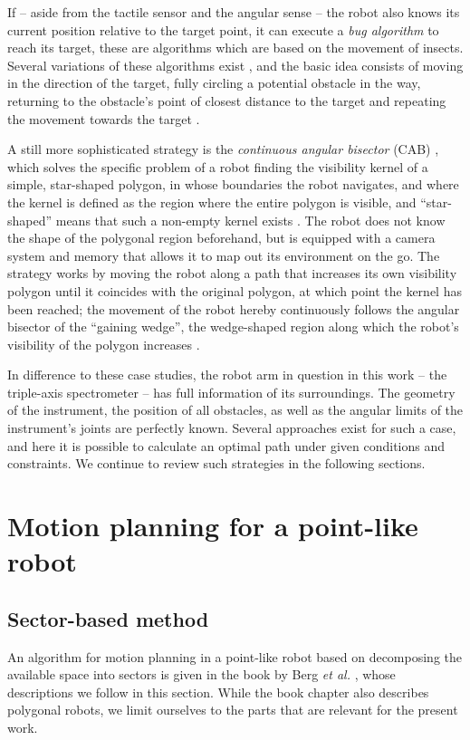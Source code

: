 If -- aside from the tactile sensor and the angular sense -- the robot also knows
its current position relative to the target point, it can execute a \textit{bug algorithm}
to reach its target, these are algorithms which are based on the movement of insects.
Several variations of these algorithms exist \cite{Choset2010_ch2}, and the basic idea consists
of moving in the direction of the target, fully circling a potential obstacle in the way,
returning to the obstacle's point of closest distance to the target and repeating the movement
towards the target \cite[Ch. 7.3.1, pp. 323-326]{FUH_geo2020}.

A still more sophisticated strategy is the \textit{continuous angular bisector}
(CAB) \cite{Icking1995}, which solves the specific problem of a robot finding the visibility kernel
of a simple, star-shaped polygon, in whose boundaries the robot navigates, and where 
the kernel is defined as the region where the entire polygon is visible, and ``star-shaped'' 
means that such a non-empty kernel exists \cite[Ch. 7.4.5, pp. 347-351]{FUH_geo2020}.
The robot does not know the shape of the polygonal region beforehand, but is equipped
with a camera system and memory that allows it to map out its environment on the go.
The strategy works by moving the robot along a path that increases its own visibility
polygon until it coincides with the original polygon, at which point the kernel has been
reached; the movement of the robot hereby continuously follows the angular bisector of the
``gaining wedge'', the wedge-shaped region along which the robot's visibility of the
polygon increases \cite[p. 261]{Icking1995}.

In difference to these case studies, the robot arm in question in this work --
the triple-axis spectrometer -- has full information of its surroundings.
The geometry of the instrument, the position of all obstacles, as well
as the angular limits of the instrument's joints are perfectly known.
Several approaches exist for such a case, and here it is possible to calculate
an optimal path under given conditions and constraints.
We continue to review such strategies in the following sections.



\section{Motion planning for a point-like robot}
\label{sec:pointrobot}

\subsection{Sector-based method}
\label{sec:pointrobot_sector}
An algorithm for motion planning in a point-like robot based on decomposing the 
available space into sectors is given in the book by Berg \textit{et al.}
\cite[Ch. 13, pp. 283-306]{Berg2008}, whose descriptions we follow in this section. 
While the book chapter also describes polygonal robots, we limit ourselves to the 
parts that are relevant for the present work.

